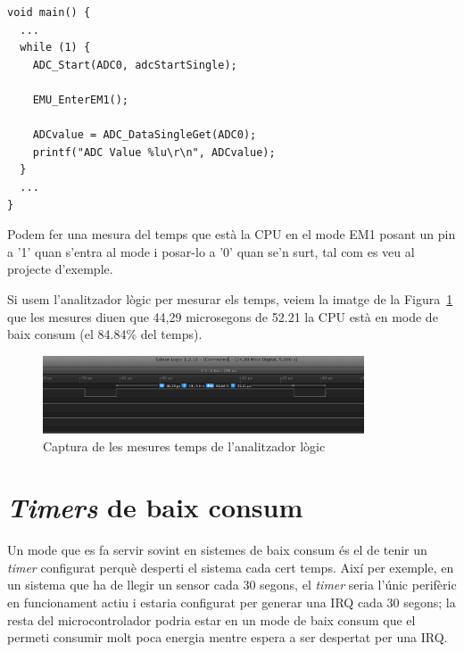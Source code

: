 \begin{lstlisting}[style=customc,caption={Bucle principal amb funcions de baix consum}, label=ADC_LP]
void main() {
  ...
  while (1) {
    ADC_Start(ADC0, adcStartSingle);

    EMU_EnterEM1();

    ADCvalue = ADC_DataSingleGet(ADC0);
    printf("ADC Value %lu\r\n", ADCvalue);
  }
  ...
}
\end{lstlisting}

Podem fer una mesura del temps que està la CPU en el mode EM1 posant un pin a '1' quan s'entra al mode i posar-lo a '0' quan se'n surt, tal com es veu al projecte d'exemple.

Si usem l'analitzador lògic per mesurar els temps, veiem la imatge de la Figura~\ref{fig:adc_logic} que les mesures diuen que 44,29 microsegons de 52.21 la CPU està en mode de baix consum (el 84.84\% del temps).

\begin{figure}
 \centering
 \includegraphics[width=0.85\textwidth, keepaspectratio]{imatges/ADC_LP1_Measurement.png}
 \caption{Captura de les mesures temps de l'analitzador lògic}
 \label{fig:adc_logic}
\end{figure}

\section{{\em Timers} de baix consum}
\label{sub:letimer_example}
Un mode que es fa servir sovint en sistemes de baix consum és el de tenir un {\em timer} configurat perquè desperti el sistema cada cert temps. Així per exemple, en un sistema que ha de llegir un sensor cada 30 segons, el {\em timer} seria l'únic perifèric en funcionament actiu i estaria configurat per generar una \gls{IRQ} cada 30 segons; la resta del microcontrolador podria estar en un mode de baix consum que el permeti consumir molt poca energia mentre espera a ser despertat per una \gls{IRQ}.

